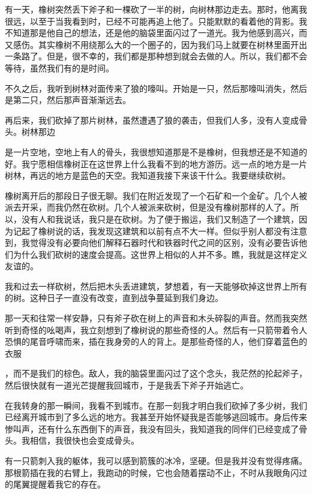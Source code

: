 \documentclass{article}
\begin{document}
有一天，橡树突然丢下斧子和一棵砍了一半的树，向树林那边走去。那时，他离我很远，以至于当我看到时，已经不可能再追上他了。只能默默的看着他的背影。我不知道那是他自己的想法，还是他的脑袋里面闪过了一道光。我为他感到高兴，而又感伤。其实橡树不用绕那么大的一个圈子的，因为我们马上就要在树林里面开出一条路了。但是，很不幸的，我们都是那种想到就会去做的人。所以，我们都不会等待，虽然我们有的是时间。


不久之后，我听到树林对面传来了狼的嚎叫。开始是一只，然后那嚎叫消失，然后是第二只，然后那声音渐渐远去。

再后来，我们砍掉了那片树林，虽然遭遇了狼的袭击，但我们人多，没有人变成骨头。树林那边

\newpage 

是一片空地，空地上有人的骨头，我很想知道那是不是橡树，但我想还是不知道的好。我宁愿相信橡树正在这世界上什么我看不到的地方游历。远一点的地方是一片树林，再远的地方是蓝色的天空。我知道我接下来该干什么。我要继续砍树。

橡树离开后的那段日子很无聊。我们在附近发现了一个石矿和一个金矿。几个人被派去开采，而我仍然在砍树。几个人被派来砍树，但是没有橡树那样的人了。所以，没有人和我说话，我只是在砍树。为了便于搬运，我们又制造了一个建筑，因为记起了橡树说的话，我发现这建筑和以前有点不大一样。但似乎别人都没有注意到，我觉得没有必要向他们解释石器时代和铁器时代之间的区别，没有必要告诉他们为什么我们砍树的速度会提高。这世界上相似的人并不多。瞧，我就是这样定义友谊的。

我和过去一样砍树，然后把木头丢进建筑，梦想着，有一天能够砍掉这世界上所有的树。这种日子一直没有改变，直到战争蔓延到我们身边。


那一天和往常一样安静，只有斧子砍在树上的声音和木头碎裂的声音。然而我突然听到奇怪的吆喝声，我立刻想到了橡树说的那些奇怪的人。然后有一只箭带着令人恐惧的尾音呼啸而来，插在我身旁的人的背上。是那些奇怪的人，他们穿着蓝色的衣服

\newpage 

，而不是我们的棕色。敌人，我的脑袋里面闪过了这个念头，我茫然的抡起斧子，然后很快就有一道光芒提醒我回城市，于是我丢下斧子开始逃亡。

在我转身的那一瞬间，我看不到城市。在那一刻我才明白我们砍掉了多少树，我们已经离开城市到了多么远的地方。我甚至开始怀疑我是否能够逃回城市。身后传来惨叫声，还有什么东西倒下的声音，我没有回头，我知道我的同伴们已经变成了骨头。我相信，我很快也会变成骨头。

有一只箭刺入我的躯体，我可以感到箭簇的冰冷，坚硬。但是我并没有觉得疼痛。那根箭插在我的右臂上，我跑动的时候，它也会随着摆动不止，不时从我眼角闪过的尾翼提醒着我它的存在。
\end{document}
